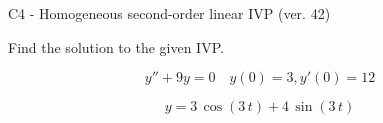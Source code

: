 \begin{exercise}
  \begin{exerciseTitle}C4 - Homogeneous second-order linear IVP (ver. 42)\end{exerciseTitle}
  \begin{exerciseStatement}
    
Find the solution to the given IVP.

    
\[y''+9y = 0 \hspace{1em} y(0) = 3 , y'(0) = 12\]

  \end{exerciseStatement}
  \begin{exerciseAnswer}
    
\[y= 3 \, \cos\left(3 \, t\right) + 4 \, \sin\left(3 \, t\right)\]

  \end{exerciseAnswer}
\end{exercise}